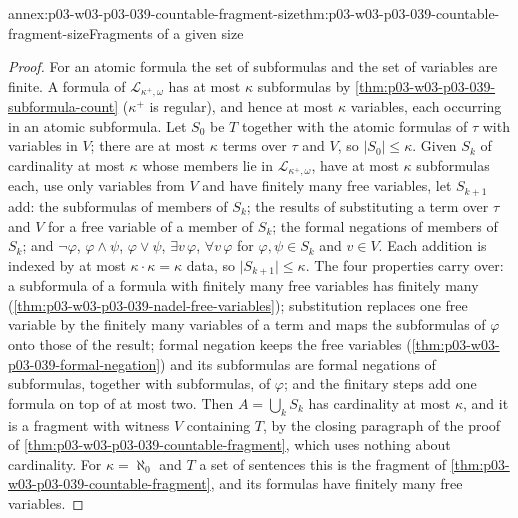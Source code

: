 \begin{annexitem}{annex:p03-w03-p03-039-countable-fragment-size}{thm:p03-w03-p03-039-countable-fragment-size}{Fragments of a given size}
\begin{proof}
For an atomic formula the set of subformulas and the set of variables are
finite. A formula of \(\mathcal L_{\kappa^+,\omega}\) has at most \(\kappa\)
subformulas by \cref{thm:p03-w03-p03-039-subformula-count} (\(\kappa^+\) is
regular), and hence at most \(\kappa\) variables, each occurring in an atomic
subformula. Let \(S_0\) be \(T\) together with the atomic formulas of \(\tau\)
with variables in \(V\); there are at most \(\kappa\) terms over \(\tau\) and
\(V\), so \(\lvert S_0\rvert\le\kappa\). Given \(S_k\) of cardinality at most
\(\kappa\) whose members lie in \(\mathcal L_{\kappa^+,\omega}\), have at most
\(\kappa\) subformulas each, use only variables from \(V\) and have finitely
many free variables, let \(S_{k+1}\) add: the subformulas of members of
\(S_k\); the results of substituting a term over \(\tau\) and \(V\) for a free
variable of a member of \(S_k\); the formal negations of members of
\(S_k\); and \(\neg\varphi\), \(\varphi\wedge\psi\), \(\varphi\vee\psi\),
\(\exists v\,\varphi\), \(\forall v\,\varphi\) for \(\varphi,\psi\in S_k\) and
\(v\in V\). Each addition is indexed by at most \(\kappa\cdot\kappa=\kappa\)
data, so \(\lvert S_{k+1}\rvert\le\kappa\). The four properties carry over:
a subformula of a formula with finitely many free variables has finitely
many (\cref{thm:p03-w03-p03-039-nadel-free-variables}); substitution replaces
one free variable by the finitely many variables of a term and maps the
subformulas of \(\varphi\) onto those of the result; formal negation keeps
the free variables (\cref{thm:p03-w03-p03-039-formal-negation}) and its
subformulas are formal negations of subformulas, together with subformulas,
of \(\varphi\); and the finitary steps add one formula on top of at most two.
Then \(A=\bigcup_kS_k\) has cardinality at most \(\kappa\), and it is a
fragment with witness \(V\) containing \(T\), by the closing paragraph of the
proof of \cref{thm:p03-w03-p03-039-countable-fragment}, which uses nothing
about cardinality. For \(\kappa=\aleph_0\) and \(T\) a set of sentences this
is the fragment of \cref{thm:p03-w03-p03-039-countable-fragment}, and its
formulas have finitely many free variables.
\end{proof}
\end{annexitem}

